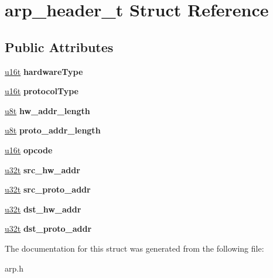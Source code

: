 \hypertarget{structarp__header__t}{}\section{arp\+\_\+header\+\_\+t Struct Reference}
\label{structarp__header__t}
\subsection*{Public Attributes}
\begin{DoxyCompactItemize}
\item 
\mbox{\label{structarp__header__t_a30ab898c2a564e7408613652cf79b8d8}} 
\hyperlink{macros_8h_a590a9a8f7df8fabfac6573e21da1922d}{u16t} {\bfseries hardware\+Type}
\item 
\mbox{\label{structarp__header__t_acbb78139544442faee7195e169409d60}} 
\hyperlink{macros_8h_a590a9a8f7df8fabfac6573e21da1922d}{u16t} {\bfseries protocol\+Type}
\item 
\mbox{\label{structarp__header__t_a5156b4d2e73aba03f0fbfbd39a74bc00}} 
\hyperlink{macros_8h_a176a4ab0531a048e0693a4520c550193}{u8t} {\bfseries hw\+\_\+addr\+\_\+length}
\item 
\mbox{\label{structarp__header__t_a7a74a900ee0f6265d46c70fa0a40a7e8}} 
\hyperlink{macros_8h_a176a4ab0531a048e0693a4520c550193}{u8t} {\bfseries proto\+\_\+addr\+\_\+length}
\item 
\mbox{\label{structarp__header__t_aa63541f0b0baec9ff726136825448914}} 
\hyperlink{macros_8h_a590a9a8f7df8fabfac6573e21da1922d}{u16t} {\bfseries opcode}
\item 
\mbox{\label{structarp__header__t_acab286049f5df99a5020a1ffae09f986}} 
\hyperlink{macros_8h_a464a07ed2c6d005d677113cc44750a64}{u32t} {\bfseries src\+\_\+hw\+\_\+addr}
\item 
\mbox{\label{structarp__header__t_ad95533ce31b86cb7cce594fbc4c16afb}} 
\hyperlink{macros_8h_a464a07ed2c6d005d677113cc44750a64}{u32t} {\bfseries src\+\_\+proto\+\_\+addr}
\item 
\mbox{\label{structarp__header__t_aa44af082ce33f0f966658b20b1267780}} 
\hyperlink{macros_8h_a464a07ed2c6d005d677113cc44750a64}{u32t} {\bfseries dst\+\_\+hw\+\_\+addr}
\item 
\mbox{\label{structarp__header__t_a4022c65d431339221111502464c1a39e}} 
\hyperlink{macros_8h_a464a07ed2c6d005d677113cc44750a64}{u32t} {\bfseries dst\+\_\+proto\+\_\+addr}
\end{DoxyCompactItemize}


The documentation for this struct was generated from the following file\+:\begin{DoxyCompactItemize}
\item 
arp.\+h\end{DoxyCompactItemize}
